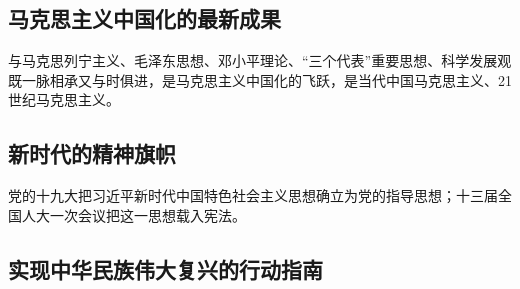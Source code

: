     \subsection{马克思主义中国化的最新成果}
        与马克思列宁主义、毛泽东思想、邓小平理论、“三个代表”重要思想、科学发展观既一脉相承又与时俱进，是马克思主义中国化的飞跃，是当代中国马克思主义、21世纪马克思主义。

    \subsection{新时代的精神旗帜}

        党的十九大把习近平新时代中国特色社会主义思想确立为党的指导思想；十三届全国人大一次会议把这一思想载入宪法。

    \subsection{实现中华民族伟大复兴的行动指南}
